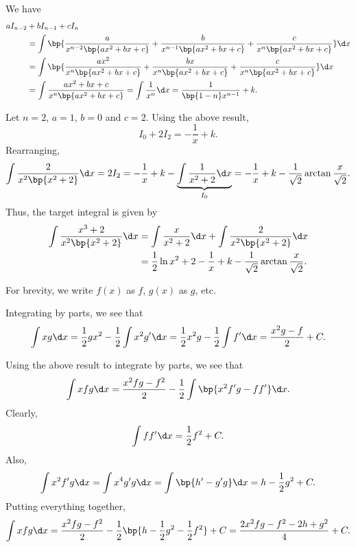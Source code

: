 \begin{solution}
    \begin{ppart}
        We have
        \begin{align*}
            aI_{n-2} &+ bI_{n-1} + cI_n\\
            &= \int \bp{\frac{a}{x^{n-2} \bp{ax^2 + bx + c}} + \frac{b}{x^{n-1} \bp{ax^2 + bx + c}} + \frac{c}{x^{n} \bp{ax^2 + bx + c}}} \d x \\
            &= \int \bp{\frac{a x^2 }{x^{n} \bp{ax^2 + bx + c}} + \frac{b x}{x^{n} \bp{ax^2 + bx + c}} + \frac{c}{x^{n} \bp{ax^2 + bx + c}}} \d x\\
            &= \int \frac{a x^2 + bx + c }{x^{n} \bp{ax^2 + bx + c}} = \int \frac1{x^n} \d x = \frac1{\bp{1 - n} x^{n-1}} + k.
        \end{align*}
    \end{ppart}
    \begin{ppart}
        Let $n = 2$, $a = 1$, $b = 0$ and $c = 2$. Using the above result, \[I_{0} + 2I_2 = -\frac{1}{x} + k.\] Rearranging, \[\int \frac2{x^2 \bp{x^2 + 2}} \d x = 2I_2 = -\frac{1}{x} + k - \underbrace{\int \frac{1}{x^2 + 2} \d x}_{I_0} = -\frac1{x} + k - \frac1{\sqrt2} \arctan \frac{x}{\sqrt2}.\] Thus, the target integral is given by
        \begin{align*}
            \int \frac{x^3 + 2}{x^2 \bp{x^2 + 2}} \d x &= \int \frac{x}{x^2 + 2} \d x + \int \frac2{x^2 \bp{x^2 + 2}} \d x\\
            &= \frac12 \ln{x^2 + 2} - \frac1{x} + k - \frac1{\sqrt2} \arctan \frac{x}{\sqrt2}.
        \end{align*}
    \end{ppart}
    \begin{ppart}
        For brevity, we write $f(x)$ as $f$, $g(x)$ as $g$, etc.
        \begin{psubpart}
            Integrating by parts, we see that \[\int x g \d x = \frac12 g x^2 - \frac12 \int x^2 g' \d x = \frac12 x^2 g - \frac12 \int f' \d x = \frac{x^2 g - f}2 + C.\]
        \end{psubpart}
        \begin{psubpart}
            Using the above result to integrate by parts, we see that \[\int xfg \d x = \frac{x^2 fg - f^2}{2} - \frac12 \int \bp{x^2 f' g - f f'} \d x.\] Clearly, \[\int f f' \d x = \frac12 f^2 + C.\] Also, \[\int x^2 f' g \d x = \int x^4 g' g \d x = \int \bp{h' - g' g} \d x = h - \frac12 g^2 + C.\] Putting everything together, \[\int xfg \d x = \frac{x^2 fg - f^2}{2} - \frac12 \bp{h - \frac12 g^2 - \frac12 f^2} + C = \frac{2x^2 fg - f^2 - 2h + g^2}{4} + C.\]
        \end{psubpart}
    \end{ppart}
\end{solution}

